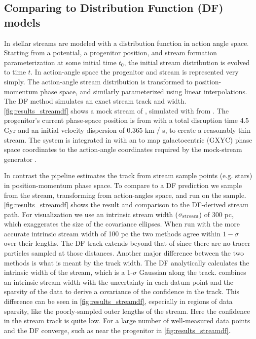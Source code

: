 \documentclass[fleqn,usenatbib]{mnras}
\begin{document}
  \subsection{Comparing to Distribution Function (DF) models}
  \label{sub:comparing_to_distribution_function_df_models}

    In \citet{Bovy2014} stellar streams are modeled with a distribution function
    in action angle space. Starting from a potential, a progenitor position, and
    stream formation parameterization at some initial time $t_0$, the initial
    stream distribution is evolved to time $t$. In action-angle space the
    progenitor and stream is represented very simply. The action-angle stream
    distribution is transformed to position-momentum phase space, and similarly
    parameterized using linear interpolations. The DF method simulates an exact
    stream track and width. \autoref{fig:results_streamdf} shows a mock stream
    of , simulated with \galpystreamdf{} from \citet{Bovy2014}.
    The progenitor's current phase-space position is from \citet{Vasiliev2019}
    with a total disruption time 4.5 Gyr and an initial velocity dispersion of
    0.365 km / s, to create a reasonably thin stream. The system is integrated
    in \galpyMWPotential{} with an
     to map
    galactocentric (GXYC) phase space coordinates to the action-angle
    coordinates required by the mock-stream generator \citep{Bovy2015}.

    In contrast the \trackstream{} pipeline estimates the track from stream
    sample points (e.g. stars) in position-momentum phase space. To compare
    \trackstream{} to a DF prediction we sample from the stream, transforming
    from action-angles space, and run \trackstream{} on the sample.
    \autoref{fig:results_streamdf} shows the result and comparison to the
    DF-derived stream path. For visualization we use an intrinsic stream width
    ($\sigma_{\rm{stream}}$) of 300 pc, which exaggerates the size of the
    covariance ellipses. When run with the more accurate intrinsic stream width
    of 100 pc the two methods agree within $1-\sigma$ over their lengths. The DF
    track extends beyond that of \trackstream{} since there are no tracer
    particles sampled at those distances. Another major difference between the
    two methods is what is meant by the track width. The DF analytically
    calculates the intrinsic width of the stream, which is a 1-$\sigma$ Gaussian
    along the track. \trackstream{} combines an intrinsic stream width with the
    uncertainty in each datum point and the sparsity of the data to derive a
    covariance of the confidence in the track. This difference can be seen in
    \autoref{fig:results_streamdf}, especially in regions of data sparsity, like
    the poorly-sampled outer lengths of the stream. Here the confidence in the
    stream track is quite low. For a large number of well-measured data points
    \trackstream{} and the DF converge, such as near the progenitor in
    \autoref{fig:results_streamdf}.
\end{document}
